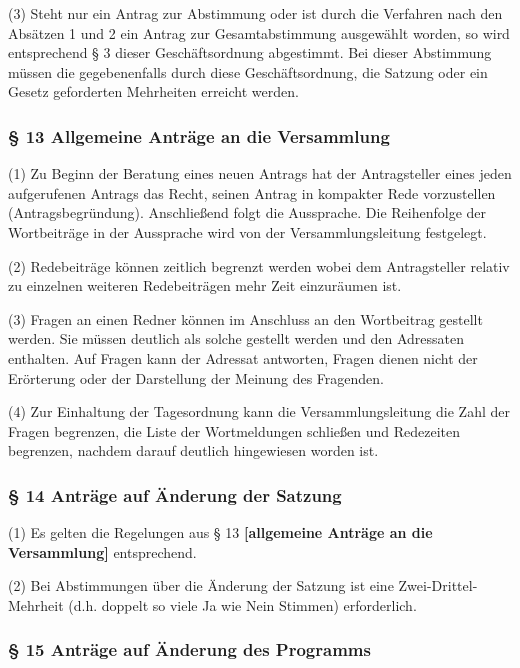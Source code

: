 (3) Steht nur ein Antrag zur Abstimmung oder ist durch die Verfahren
nach den Absätzen 1 und 2 ein Antrag zur Gesamtabstimmung ausgewählt
worden, so wird entsprechend § 3 dieser Geschäftsordnung abgestimmt. Bei
dieser Abstimmung müssen die gegebenenfalls durch diese
Geschäftsordnung, die Satzung oder ein Gesetz geforderten Mehrheiten
erreicht werden.

\subsubsection{§ 13 Allgemeine Anträge an die Versammlung}

(1) Zu Beginn der Beratung eines neuen Antrags hat der Antragsteller
eines jeden aufgerufenen Antrags das Recht, seinen Antrag in kompakter
Rede vorzustellen (Antragsbegründung). Anschließend folgt die
Aussprache. Die Reihenfolge der Wortbeiträge in der Aussprache wird von
der Versammlungsleitung festgelegt.

(2) Redebeiträge können zeitlich begrenzt werden wobei dem Antragsteller
relativ zu einzelnen weiteren Redebeiträgen mehr Zeit einzuräumen ist.

(3) Fragen an einen Redner können im Anschluss an den Wortbeitrag
gestellt werden. Sie müssen deutlich als solche gestellt werden und den
Adressaten enthalten. Auf Fragen kann der Adressat antworten, Fragen
dienen nicht der Erörterung oder der Darstellung der Meinung des
Fragenden.

(4) Zur Einhaltung der Tagesordnung kann die Versammlungsleitung die
Zahl der Fragen begrenzen, die Liste der Wortmeldungen schließen und
Redezeiten begrenzen, nachdem darauf deutlich hingewiesen worden ist.

\subsubsection{§ 14 Anträge auf Änderung der Satzung}

(1) Es gelten die Regelungen aus § 13 \textbf{{[}allgemeine Anträge an
die Versammlung{]}} entsprechend.

(2) Bei Abstimmungen über die Änderung der Satzung ist eine
Zwei-Drittel-Mehrheit (d.h. doppelt so viele Ja wie Nein Stimmen)
erforderlich.

\subsubsection{§ 15 Anträge auf Änderung des Programms}


